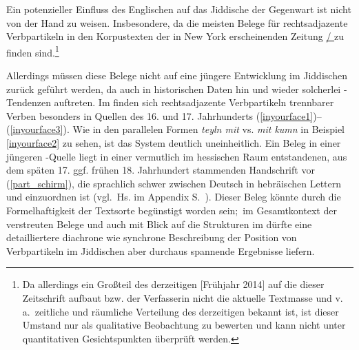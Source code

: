 Ein potenzieller Einfluss des Englischen auf das Jiddische der Gegenwart ist nicht von der Hand zu weisen. Insbesondere, da die meisten Belege für rechtsadjazente Verbpartikeln in den Korpustexten der in New York erscheinenden Zeitung \href{http://yiddish.forward.com/}{/ } %
zu finden sind.\footnote{Da allerdings ein Großteil des derzeitigen [Frühjahr 2014]  auf die  dieser Zeitschrift aufbaut bzw. der Verfasserin nicht die aktuelle Textmasse und v.\,a.\, zeitliche und räumliche Verteilung des derzeitigen  bekannt ist, ist dieser Umstand nur als qualitative Beobachtung zu bewerten und kann nicht unter quantitativen Gesichtspunkten überprüft werden.} 

Allerdings müssen diese Belege nicht auf eine jüngere Entwicklung im Jiddischen zurück geführt werden, da auch in historischen Daten hin und wieder solcherlei \hai{{\VO}}-Tendenzen auftreten. Im  finden sich  rechtsadjazente Verbpartikeln trennbarer Verben besonders in Quellen des 16. und 17. Jahrhunderts (\ref{inyourface1})–(\ref{inyourface3}). Wie in den parallelen Formen \textit{teyln mit} vs. \textit{mit kumn} in Beispiel \ref{inyourface2} zu sehen, ist das System deutlich uneinheitlich. Ein Beleg in einer jüngeren -Quelle liegt in einer vermutlich im hessischen Raum entstandenen, aus dem späten 17. ggf. frühen 18. Jahrhundert stammenden Handschrift vor (\ref{part_schirm}), die sprachlich schwer zwischen Deutsch in hebräischen Lettern und  einzuordnen ist (vgl.\, Hs. im Appendix S.\, \pageref{part_schirm}). Dieser Beleg könnte durch die Formelhaftigkeit der Textsorte begünstigt worden sein;\, im Gesamtkontext der verstreuten Belege und auch mit Blick auf die Strukturen im \hai{{\LiJi}} dürfte eine detailliertere diachrone wie synchrone Beschreibung der Position von Verbpartikeln im Jiddischen aber durchaus spannende Ergebnisse liefern. 

